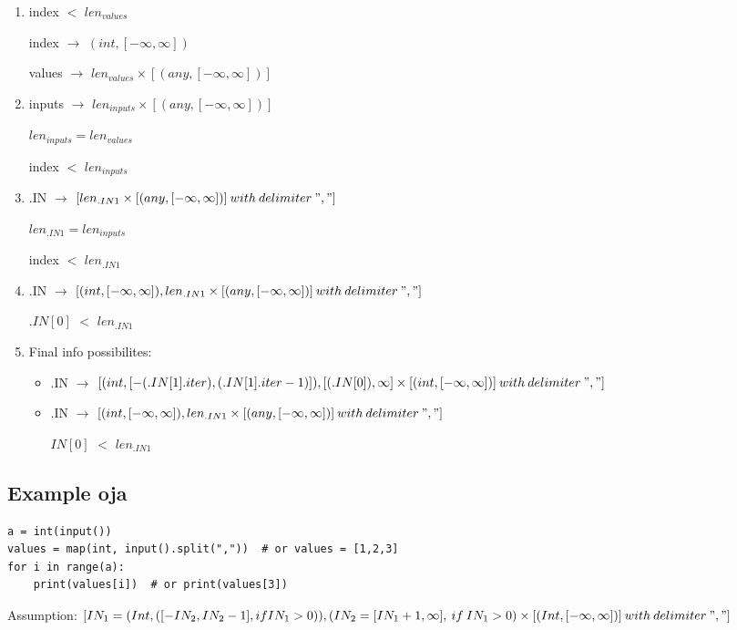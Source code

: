 \documentclass[11pt]{article}
\begin{document}
\begin{enumerate}
  \item index $<$ $len_{values}$

  index $\rightarrow$ $(int, [-\infty, \infty])$

  values $\rightarrow$ $len_{values}\times[(any, [-\infty, \infty])]$

  \item inputs $\rightarrow$ $len_{inputs}\times[(any, [-\infty, \infty])]$

  $len_{inputs} = len_{values}$

  index $<$ $len_{inputs}$

  \item .IN $\rightarrow$ $[len_{.IN1}\times[(any, [-\infty, \infty])]\:with\:delimiter\:","]$

  $len_{.IN1} = len_{inputs}$

  index $<$ $len_{.IN1}$

  \item .IN $\rightarrow$ $[(int, [-\infty, \infty]), len_{.IN1}\times[(any, [-\infty, \infty])]\:with\:delimiter\:","]$

  $.IN[0]$ $<$ $len_{.IN1}$

  \item Final info possibilites:

  \begin{itemize}
    \item .IN $\rightarrow$ $[(int, [-(.IN[1].iter), (.IN[1].iter-1)]), [(.IN[0]), \infty]\times[(int, [-\infty, \infty])]\:with\:delimiter\:","]$
    
    \item .IN $\rightarrow$ $[(int, [-\infty, \infty]), len_{.IN1}\times[(any, [-\infty, \infty])]\:with\:delimiter\:","]$
    
    $IN[0]$ $<$ $len_{.IN1}$
  \end{itemize}
  
\end{enumerate}


\subsection{Example oja}
\begin{lstlisting}
a = int(input())
values = map(int, input().split(","))  # or values = [1,2,3]
for i in range(a):
    print(values[i])  # or print(values[3])
\end{lstlisting}


Assumption: $[IN_1 = (Int, ([-IN_2, IN_2-1], if IN_1 > 0)), (IN_2 = [IN_1+1, \infty],\:if\:IN_1 > 0) \times [(Int, [-\infty, \infty])]\:with\:delimiter\:","]$\\
\end{document}

